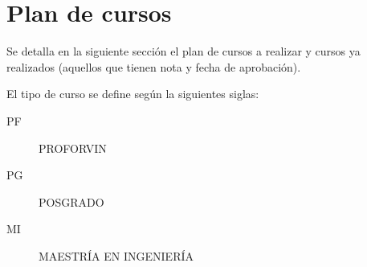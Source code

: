 \documentclass[
	11pt,oneside,a4paper,
	headsepline,footsepline,
	fleqn,
]{memoir}
\begin{document}


\newpage

\ifdefined\borrador
	\listoftodos
\fi 

\section*{Plan de cursos}

Se detalla en la siguiente sección el plan de cursos a realizar y cursos ya realizados (aquellos que tienen nota y fecha de aprobación).

El tipo de curso se define según la siguientes siglas:
\begin{description}
    \item[PF] PROFORVIN
    \item[PG] POSGRADO
    \item[MI] MAESTRÍA EN INGENIERÍA  
\end{description}
\end{document}

